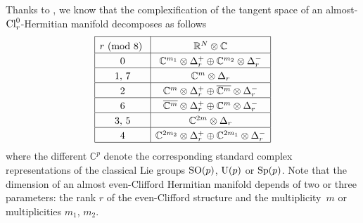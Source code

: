 \documentclass[pdftex]{sigma}
\newcommand\tstrut{\rule{0pt}{2.6ex}}
\numberwithin{equation}{section}
\begin{document}
Thanks to \cite{Arizmendi-Herrera}, we know that the complexif\/ication of the tangent space of an almost-${\rm Cl}_r^0$-Hermitian manifold decomposes as follows
\begin{gather}
\begin{array}{|c|c|}
 \hline
 r \mbox{\ {\rm (mod 8)} } &\mathbb{R}^N\otimes \mathbb{C}
\rule{0pt}{3ex}\\
\hline
 0 & \mathbb{C}^{m_1}\otimes \Delta_r^+ \oplus \mathbb{C}^{m_2}\otimes \Delta_r^-\tstrut\\
 \hline
 1,\,7 & \mathbb{C}^m\otimes \Delta_r\tstrut\\
\hline
 2 & \mathbb{C}^m\otimes \Delta_r^+\oplus\overline{\mathbb{C}^m}\otimes\Delta_r^-\tstrut\\
\hline
 6 & \overline{\mathbb{C}^m}\otimes \Delta_r^+\oplus \mathbb{C}^m\otimes\Delta_r^-\tstrut\\
\hline
 3,\,5 & \mathbb{C}^{2m}\otimes \Delta_r\tstrut\\
\hline
 4 & \mathbb{C}^{2m_2}\otimes \Delta_r^+ \oplus \mathbb{C}^{2m_1}\otimes \Delta_r^-\tstrut\\
\hline
 \end{array}\label{eq: complexified R^N}
\end{gather}
where the dif\/ferent $\mathbb{C}^p$ denote the corresponding standard complex representations of the classical Lie groups ${\rm SO}(p)$, ${\rm U}(p)$ or ${\rm Sp}(p)$. Note that the dimension of an almost even-Clif\/ford Hermitian manifold depends of two or three parameters: the rank $r$ of the even-Clif\/ford structure and the multiplicity~$m$ or multiplicities $m_1$, $m_2$.
\end{document}
